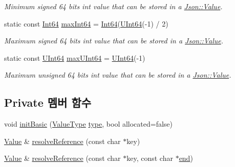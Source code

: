 \begin{DoxyCompactItemize}
\begin{DoxyCompactList}\small\item\em Minimum signed 64 bits int value that can be stored in a \hyperlink{class_json_1_1_value}{Json\+::\+Value}. \end{DoxyCompactList}\item 
static const \hyperlink{class_json_1_1_value_a1b86af9f85f0f1baa972c3319fa22695}{Int64} \hyperlink{class_json_1_1_value_a4492634870b8c5709ce967b384ac6006}{max\+Int64} = \hyperlink{class_json_1_1_value_a1b86af9f85f0f1baa972c3319fa22695}{Int64}(\hyperlink{class_json_1_1_value_a8b62564be8c087c6d18de180ff4e13e3}{U\+Int64}(-\/1) / 2)
\begin{DoxyCompactList}\small\item\em Maximum signed 64 bits int value that can be stored in a \hyperlink{class_json_1_1_value}{Json\+::\+Value}. \end{DoxyCompactList}\item 
static const \hyperlink{class_json_1_1_value_a8b62564be8c087c6d18de180ff4e13e3}{U\+Int64} \hyperlink{class_json_1_1_value_ae1eb89c305c39516696ff305cffa01da}{max\+U\+Int64} = \hyperlink{class_json_1_1_value_a8b62564be8c087c6d18de180ff4e13e3}{U\+Int64}(-\/1)
\begin{DoxyCompactList}\small\item\em Maximum unsigned 64 bits int value that can be stored in a \hyperlink{class_json_1_1_value}{Json\+::\+Value}. \end{DoxyCompactList}\end{DoxyCompactItemize}
\subsection*{Private 멤버 함수}
\begin{DoxyCompactItemize}
\item 
void \hyperlink{class_json_1_1_value_a32b86b71564157f40f880f5736be822a}{init\+Basic} (\hyperlink{namespace_json_a7d654b75c16a57007925868e38212b4e}{Value\+Type} \hyperlink{class_json_1_1_value_a8ce61157a011894f0252ceed232312de}{type}, bool allocated=false)
\item 
\hyperlink{class_json_1_1_value}{Value} \& \hyperlink{class_json_1_1_value_a9ff9cdae2c8f4155bab603d750b0b3f1}{resolve\+Reference} (const char $\ast$key)
\item 
\hyperlink{class_json_1_1_value}{Value} \& \hyperlink{class_json_1_1_value_a5f6b3aaf4f2e952a33dd823db008c333}{resolve\+Reference} (const char $\ast$key, const char $\ast$\hyperlink{class_json_1_1_value_a3e443cd0ef24f7e028b175e47ee045e0}{end})
\end{DoxyCompactItemize}

